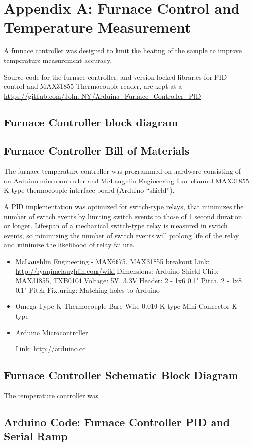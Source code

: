 
	\section{Appendix A: Furnace Control and Temperature Measurement}

	A furnace controller was designed to limit the heating of the sample to improve temperature measurement accuracy.

	Source code for the furnace controller, and version-locked libraries for PID control and MAX31855 Thermocouple reader, are kept at a \url{https://github.com/John-NY/Arduino_Furnace_Controller_PID}.

	\subsection{Furnace Controller block diagram}

	\subsection{Furnace Controller Bill of Materials}

	The furnace temperature controller was programmed on hardware consisting of an Arduino microcontroller and McLaughlin Engineering four channel MAX31855 K-type thermocouple interface board (Arduino ``shield''). 

	A PID implementation was optimized for switch-type relays, that minimizes the number of switch events by limiting switch events to those of 1 second duration or longer.
	Lifespan of a mechanical switch-type relay is measured in switch events, so minimizing the number of switch events will prolong life of the relay and minimize the likelihood of relay failure.
	

		\begin{itemize}

			\item McLaughlin Engineering - MAX6675, MAX31855 breakout
				\subitem Link: \url{http://ryanjmclaughlin.com/wiki}
				\subitem Dimensions: Arduino Shield
				\subitem Chip: MAX31855, TXB0104
				\subitem Voltage: 5V, 3.3V
				\subitem Header: 2 - 1x6 0.1" Pitch, 2 - 1x8 0.1" Pitch
				\subitem Fixturing: Matching holes to Arduino

			\item Omega Type-K Thermocouple
				\subitem Bare Wire 0.010 K-type
				\subitem Mini Connector K-type

			\item Arduino Microcontroller

				\subitem Link: \url{http://arduino.cc}

		\end{itemize}

	\subsection{Furnace Controller Schematic Block Diagram}
	The temperature controller was 

	\subsection{Arduino Code: Furnace Controller PID and Serial Ramp}

